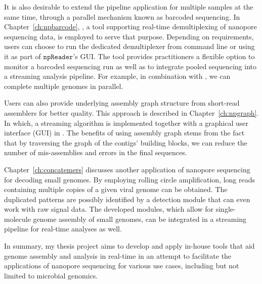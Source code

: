 It is also desirable to extend the pipeline application for multiple samples at the same time, through a parallel mechanism known as barcoded sequencing.
In Chapter~\ref{ch:npbarcode}, \npbarcode{}, a tool supporting real-time demultiplexing of nanopore sequencing data, is employed to serve that purpose. 
Depending on requirements, users can choose to run the dedicated demultiplexer from command line or using it as part of $\mathtt{npReader}$'s GUI. The tool provides practitioners a flexible option to monitor a barcoded sequencing run as well as to integrate pooled sequencing into a streaming analysis pipeline. For example, in combination with \npscarf{}, we can complete multiple genomes in parallel.

Users can also provide underlying assembly graph structure from short-read assemblers for better quality. This approach is described in Chapter~\ref{ch:npgraph}. In which, a streaming algorithm is implemented together with a graphical user interface (GUI) in \npgraph{}. The benefits of using assembly graph stems from the fact that by traversing the graph of the contigs' building blocks, we can reduce the number of mis-assemblies and errors in the final sequences. 

Chapter~\ref{ch:concatemers} discusses another application of nanopore sequencing for decoding small genomes. By employing rolling circle amplification, long reads containing multiple copies of a given viral genome can be obtained. The duplicated patterns are possibly identified by a detection module that can even work with raw signal data. The developed modules, which allow for single-molecule genome assembly of small genomes, can be integrated in a streaming pipeline for real-time analyses as well.

In summary, my thesis project aims to develop and apply in-house tools that aid genome assembly and analysis in real-time in an attempt to facilitate the applications of nanopore sequencing for various use cases, including but not limited to microbial genomics.
